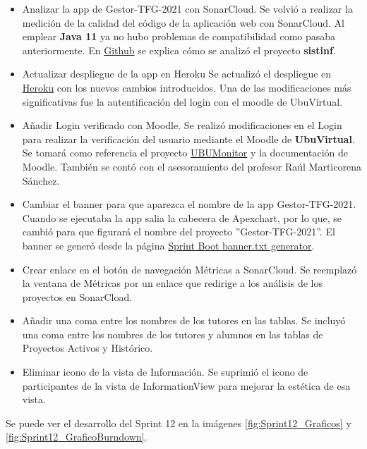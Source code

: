 \begin{itemize}
	\item Analizar la app de Gestor-TFG-2021 con SonarCloud. 
		Se volvió a realizar la medición de la calidad del código de la aplicación web con SonarCloud. Al emplear \textbf{Java 11} ya no hubo problemas de compatibilidad como pasaba anteriormente. En \href{https://github.com/dbo1001/Gestor-TFG-2021/issues/142}{Github} se explica cómo se analizó el proyecto \textbf{sistinf}.
	\item Actualizar despliegue de la app en Heroku
		Se actualizó el despliegue en \href{https://gestor-tfg-2021.herokuapp.com/}{Heroku} con los nuevos cambios introducidos. Una de las modificaciones más significativas fue la autentificación del login con el moodle de UbuVirtual.
	\item Añadir Login verificado con Moodle. 
		Se realizó modificaciones en el Login para realizar la verificación del usuario mediante el Moodle de \textbf{UbuVirtual}. Se tomará como referencia el proyecto \href{https://github.com/yjx0003/UBUMonitor}{UBUMonitor} y la documentación de Moodle. También se contó con el asesoramiento del profesor Raúl Marticorena Sánchez.
	\item Cambiar el banner para que aparezca el nombre de la app Gestor-TFG-2021.
		Cuando se ejecutaba la app salia la cabecera de Apexchart, por lo que, se cambió para que figurará el nombre del proyecto ''Gestor-TFG-2021''. El banner se generó desde la página \href{https://devops.datenkollektiv.de/banner.txt/index.html}{Sprint Boot banner.txt generator}.
	\item Crear enlace en el botón de navegación Métricas a SonarCloud.
		Se reemplazó la ventana de Métricas por un enlace que redirige a los análisis de los proyectos en SonarCload.
	\item Añadir una coma entre los nombres de los tutores en las tablas.
		Se incluyó una coma entre los nombres de los tutores y alumnos en las tablas de Proyectos Activos y Histórico.
	\item Eliminar icono de la vista de Información.
		Se suprimió el icono de participantes de la vista de InformationView para mejorar la estética de esa vista.
	
\end{itemize}

Se puede ver el desarrollo del Sprint 12 en la imágenes \ref{fig:Sprint12_Graficos} y \ref{fig:Sprint12_GraficoBurndown}.


